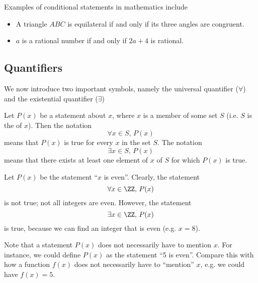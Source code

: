 Examples of conditional statements in mathematics include
\begin{itemize}
    \item A triangle $ABC$ is equilateral if and only if its three angles are congruent.
    \item $a$ is a rational number if and only if $2a + 4$ is rational.
\end{itemize}

\subsection{Quantifiers}

We now introduce two important symbols, namely the universal quantifier ($\forall$) and the existential quantifier ($\exists$)

\begin{definition}
    Let $P(x)$ be a statement about $x$, where $x$ is a member of some set $S$ (i.e. $S$ is the  of $x$). Then the notation \[\forall x \in S, \, P(x)\] means that $P(x)$ is true for every $x$ in the set $S$. The notation \[\exists x \in S, \, P(x)\] means that there exists at least one element of $x$ of $S$ for which $P(x)$ is true.
\end{definition}

\begin{example}
    Let $P(x)$ be the statement ``$x$ is even''. Clearly, the statement \[\forall x \in \ZZ, \, P(x)\] is not true; not all integers are even. However, the statement \[\exists x \in \ZZ, \, P(x)\] is true, because we can find an integer that is even (e.g. $x = 8$).
\end{example}

Note that a statement $P(x)$ does not necessarily have to mention $x$. For instance, we could define $P(x)$ as the statement ``5 is even''. Compare this with how a function $f(x)$ does not necessarily have to ``mention'' $x$, e.g. we could have $f(x) = 5$.

